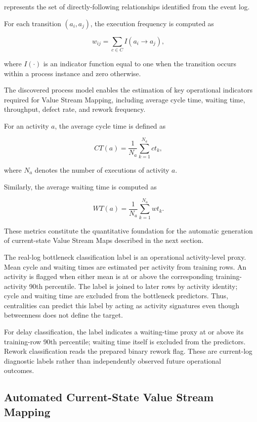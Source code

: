\documentclass[pdflatex,iicol,Numbered,sn-basic]{sn-jnl}
\begin{document}
represents the set of directly-following relationships identified from the event log.

For each transition \((a_i,a_j)\), the execution frequency is computed as

\[
w_{ij}
=
\sum_{c\in C}
I(a_i \rightarrow a_j),
\]

where \(I(\cdot)\) is an indicator function equal to one when the transition occurs within a process instance and zero otherwise.

The discovered process model enables the estimation of key operational indicators required for Value Stream Mapping, including average cycle time, waiting time, throughput, defect rate, and rework frequency.

For an activity \(a\), the average cycle time is defined as

\[
CT(a)
=
\frac{1}{N_a}
\sum_{k=1}^{N_a}
ct_k,
\]

where \(N_a\) denotes the number of executions of activity \(a\).

Similarly, the average waiting time is computed as

\[
WT(a)
=
\frac{1}{N_a}
\sum_{k=1}^{N_a}
wt_k.
\]

These metrics constitute the quantitative foundation for the automatic generation of current-state Value Stream Maps described in the next section.


The real-log bottleneck classification label is an operational activity-level proxy. Mean cycle and waiting times are estimated per activity from training rows. An activity is flagged when either mean is at or above the corresponding training-activity 90th percentile. The label is joined to later rows by activity identity; cycle and waiting time are excluded from the bottleneck predictors. Thus, centralities can predict this label by acting as activity signatures even though betweenness does not define the target.

For delay classification, the label indicates a waiting-time proxy at or above its training-row 90th percentile; waiting time itself is excluded from the predictors. Rework classification reads the prepared binary rework flag. These are current-log diagnostic labels rather than independently observed future operational outcomes.

\subsection{Automated Current-State Value Stream Mapping}
\end{document}
